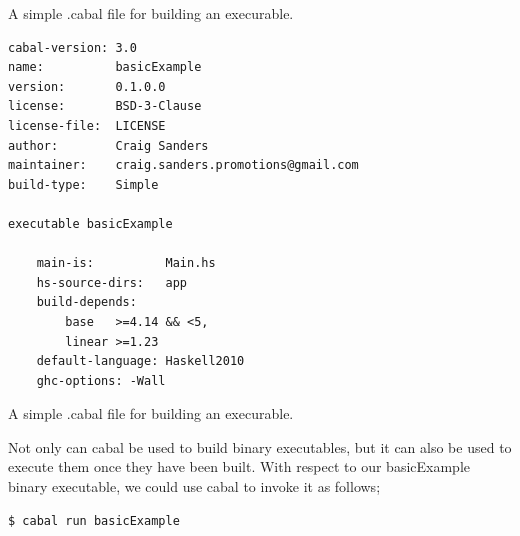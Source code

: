 
\begin{frame}[t, fragile]{A simple .cabal file for building an execurable.}

\begin{verbatim}
cabal-version: 3.0
name:          basicExample
version:       0.1.0.0
license:       BSD-3-Clause
license-file:  LICENSE
author:        Craig Sanders
maintainer:    craig.sanders.promotions@gmail.com
build-type:    Simple

executable basicExample

    main-is:          Main.hs
    hs-source-dirs:   app
    build-depends:
        base   >=4.14 && <5,
        linear >=1.23
    default-language: Haskell2010
    ghc-options: -Wall
\end{verbatim}

\end{frame}



\begin{frame}[t, fragile]{A simple .cabal file for building an execurable.}

Not only can cabal be used to build binary executables, but it can also
be used to execute them once they have been built. With respect to our
basicExample binary executable, we could use cabal to invoke it as follows;

\begin{verbatim}
$ cabal run basicExample
\end{verbatim}

\end{frame}